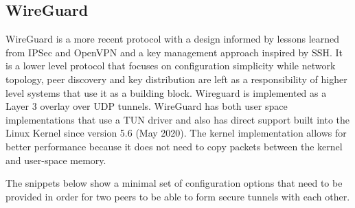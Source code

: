 \hypertarget{thesis__020-related-work.md__wireguard}{%
\subsection{WireGuard}\label{thesis__020-related-work.md__wireguard}}

WireGuard \autocite{donenfeldWireGuardNextGeneration2017} is a more
recent protocol with a design informed by lessons learned from IPSec and
OpenVPN and a key management approach inspired by SSH. It is a lower
level protocol that focuses on configuration simplicity while network
topology, peer discovery and key distribution are left as a
responsibility of higher level systems that use it as a building block.
Wireguard is implemented as a Layer 3 overlay over UDP tunnels.
WireGuard has both user space implementations that use a TUN driver and
also has direct support built into the Linux Kernel since version 5.6
(May 2020). The kernel implementation allows for better performance
because it does not need to copy packets between the kernel and
user-space memory.

The snippets below show a minimal set of configuration options that need
to be provided in order for two peers to be able to form secure tunnels
with each other.

\begin{Shaded}
\begin{Highlighting}[]
\KeywordTok{[Interface]}
\OtherTok{=}
\OtherTok{=}\StringTok{ }
\OtherTok{=}

\KeywordTok{[Peer]}
\OtherTok{=}
\OtherTok{=}
\OtherTok{=}
\end{Highlighting}
\end{Shaded}

\begin{Shaded}
\begin{Highlighting}[]
\KeywordTok{[Interface]}
\OtherTok{=}
\OtherTok{=}\StringTok{ }
\OtherTok{=}

\KeywordTok{[Peer]}
\OtherTok{=}
\OtherTok{=}
\end{Highlighting}
\end{Shaded}


